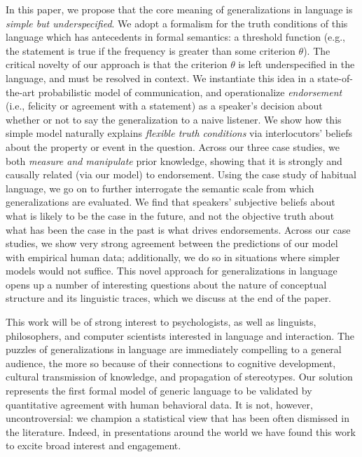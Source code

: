\documentclass[11pt,letterpaper]{letter} %
\begin{document}
\begin{letter}
In this paper, we propose that the core meaning of generalizations in language is \emph{simple but underspecified}.
We adopt a formalism for the truth conditions of this language which has antecedents in formal semantics: a threshold function (e.g., the statement is true if the frequency is greater than some criterion $\theta$).
The critical novelty of our approach is that the criterion $\theta$ is left underspecified in the language, and must be resolved in context.
We instantiate this idea in a state-of-the-art probabilistic model of communication, and operationalize \emph{endorsement} (i.e., felicity or agreement with a statement) as a speaker's decision about whether or not to say the generalization to a naive listener.
We show how this simple model naturally explains \emph{flexible truth conditions} via interlocutors' beliefs about the property or event in the question.
Across our three case studies, we both \emph{measure and manipulate} prior knowledge, showing that it is strongly and causally related (via our model) to endorsement. 
Using the case study of habitual language, we go on to further interrogate the semantic scale from which generalizations are evaluated.
We find that speakers' subjective beliefs about what is likely to be the case in the future, and not the objective truth about what has been the case in the past is what drives endorsements. 
Across our case studies, we show very strong agreement between the predictions of our model with empirical human data; additionally, we do so in situations where simpler models would not suffice. 
This novel approach for generalizations in language opens up a number of interesting questions about the nature of conceptual structure and its linguistic traces, which we discuss at the end of the paper.

This work will be of strong interest to psychologists, as well as linguists, philosophers, and computer scientists interested in language and interaction.
The puzzles of generalizations in language are immediately compelling to a general audience, the more so because of their connections to cognitive development, cultural transmission of knowledge, and propagation of stereotypes.
Our solution represents the first formal model of generic language to be validated by quantitative agreement with human behavioral data.
It is not, however, uncontroversial: we champion a statistical view that has been often dismissed in the literature.
Indeed, in presentations around the world we have found this work to excite broad interest and engagement.


\end{letter}
\end{document}

